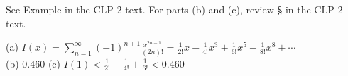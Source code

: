 \begin{hint}
See Example  in the
CLP-2 text.
For parts (b) and (c), review  \S {} in the
CLP-2 text.

\end{hint}

\begin{answer}
(a)
 $\displaystyle I(x)=\sum_{n=1}^\infty (-1)^{n+1}\frac{x^{2n-1}}{(2n)!}= \frac{1}{2!}x-\frac{1}{4!}x^3+\frac{1}{6!}x^5-\frac{1}{8!}x^8+\cdots$
\\ (b)
 0.460
\qquad (c)
 $\displaystyle I(1)<\frac{1}{2!}-\frac{1}{4!}+\frac{1}{6!}<0.460$

\end{answer}

